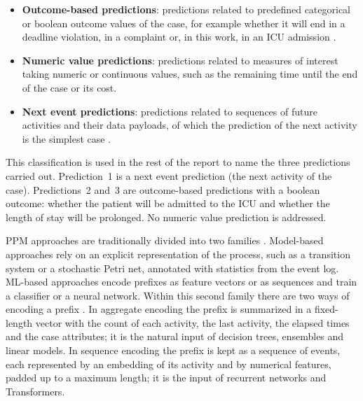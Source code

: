 \begin{itemize}[leftmargin=*]
  \item \textbf{Outcome-based predictions}: predictions related to predefined categorical or boolean outcome values of the case, for example whether it will end in a deadline violation, in a complaint or, in this work, in an ICU admission \cite{teinemaa2019}.
  \item \textbf{Numeric value predictions}: predictions related to measures of interest taking numeric or continuous values, such as the remaining time until the end of the case \cite{aalst2011} or its cost.
  \item \textbf{Next event predictions}: predictions related to sequences of future activities and their data payloads, of which the prediction of the next activity is the simplest case \cite{tax2017}.
\end{itemize}

This classification is used in the rest of the report to name the three predictions carried out. Prediction~1 is a next event prediction (the next activity of the case). Predictions~2 and~3 are outcome-based predictions with a boolean outcome: whether the patient will be admitted to the ICU and whether the length of stay will be prolonged. No numeric value prediction is addressed.

PPM approaches are traditionally divided into two families \cite{difrancescomarino2018}. Model-based approaches rely on an explicit representation of the process, such as a transition system or a stochastic Petri net, annotated with statistics from the event log. ML-based approaches encode prefixes as feature vectors or as sequences and train a classifier or a neural network. Within this second family there are two ways of encoding a prefix \cite{teinemaa2019}. In aggregate encoding the prefix is summarized in a fixed-length vector with the count of each activity, the last activity, the elapsed times and the case attributes; it is the natural input of decision trees, ensembles and linear models. In sequence encoding the prefix is kept as a sequence of events, each represented by an embedding of its activity and by numerical features, padded up to a maximum length; it is the input of recurrent networks and Transformers.

